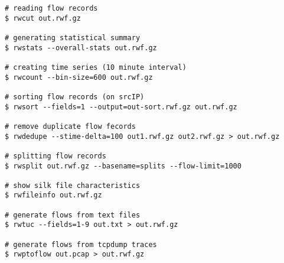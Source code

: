 \begin{lstlisting}
# reading flow records
$ rwcut out.rwf.gz

# generating statistical summary
$ rwstats --overall-stats out.rwf.gz

# creating time series (10 minute interval)
$ rwcount --bin-size=600 out.rwf.gz

# sorting flow records (on srcIP)
$ rwsort --fields=1 --output=out-sort.rwf.gz out.rwf.gz

# remove duplicate flow fecords
$ rwdedupe --stime-delta=100 out1.rwf.gz out2.rwf.gz > out.rwf.gz

# splitting flow records
$ rwsplit out.rwf.gz --basename=splits --flow-limit=1000

# show silk file characteristics
$ rwfileinfo out.rwf.gz

# generate flows from text files
$ rwtuc --fields=1-9 out.txt > out.rwf.gz

# generate flows from tcpdump traces
$ rwptoflow out.pcap > out.rwf.gz
\end{lstlisting}
